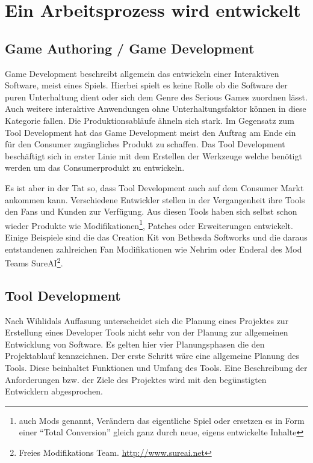 \documentclass[pagesize, paper=a4, fontsize=12pt,titlepage=true, headings=small, headnosepline, abstractoff, liststotoc, nochapterprefix, plainheadsepline, twoside]{scrreprt}
\begin{document}
\section{Ein Arbeitsprozess wird entwickelt}
\subsection{Game Authoring / Game Development}
Game Development beschreibt allgemein das entwickeln einer Interaktiven Software, meist eines Spiels. Hierbei spielt es keine Rolle ob die Software der puren Unterhaltung dient oder sich dem Genre des Serious Games zuordnen lässt. Auch weitere interaktive Anwendungen ohne Unterhaltungsfaktor können in diese Kategorie fallen. Die Produktionsabläufe ähneln sich stark. Im Gegensatz zum Tool Development hat das Game Development meist den Auftrag am Ende ein für den Consumer zugängliches Produkt zu schaffen. Das Tool Development beschäftigt sich in erster Linie mit dem Erstellen der Werkzeuge welche benötigt werden um das Consumerprodukt zu entwickeln.

Es ist aber in der Tat so, dass Tool Development auch auf dem Consumer Markt ankommen kann. Verschiedene Entwickler stellen in der Vergangenheit ihre Tools den Fans und Kunden zur Verfügung. Aus diesen Tools haben sich selbst schon wieder Produkte wie Modifikationen\footnote{auch Mods genannt, Verändern das eigentliche Spiel oder ersetzen es in Form einer “Total Conversion” gleich ganz durch neue, eigens entwickelte Inhalte}, Patches oder Erweiterungen entwickelt. Einige Beispiele sind die das Creation Kit von Bethesda Softworks und die daraus entstandenen zahlreichen Fan Modifikationen wie Nehrim oder Enderal des Mod Teams SureAI\footnote{Freies Modifikations Team. \url{http://www.sureai.net}}.


\subsection{Tool Development}
Nach Wihlidals Auffasung \parencite{Wihlidal2006} unterscheidet sich die Planung eines Projektes zur Erstellung eines Developer Tools nicht sehr von der Planung zur allgemeinen Entwicklung von Software. Es gelten hier vier Planungsphasen die den Projektablauf kennzeichnen. Der erste Schritt wäre eine allgemeine Planung des Tools. Diese beinhaltet Funktionen und Umfang des Tools. Eine Beschreibung der Anforderungen bzw. der Ziele des Projektes wird mit den begünstigten Entwicklern abgesprochen.
\end{document}

